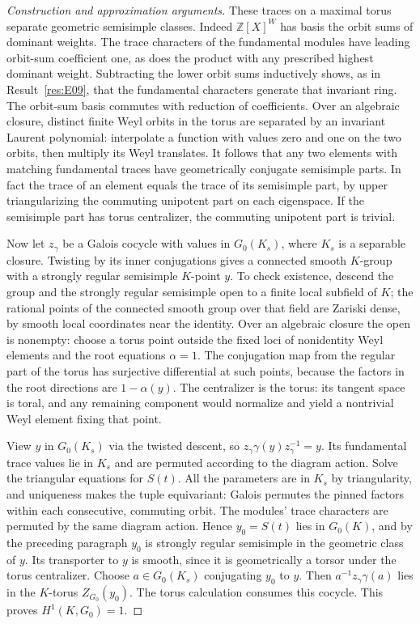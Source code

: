 \documentclass[11pt,a4paper,openany,oneside]{book}
\theoremstyle{resultstyle}
\theoremstyle{definition}
\numberwithin{equation}{chapter}
\begin{document}
\begin{proof}[Construction and approximation arguments]
These traces on a maximal torus separate geometric
semisimple classes. Indeed \(\mathbb Z[X]^W\) has basis
the orbit sums of dominant weights. The trace characters
of the fundamental modules have leading orbit-sum
coefficient one, as does the product with any prescribed
highest dominant weight. Subtracting the lower orbit
sums inductively shows, as in Result~\ref{res:E09},
that the fundamental characters generate that invariant
ring. The orbit-sum basis commutes with reduction of
coefficients. Over an algebraic closure, distinct finite
Weyl orbits in the torus are separated by an invariant
Laurent polynomial: interpolate a function with values
zero and one on the two orbits, then multiply its
Weyl translates. It follows that any two elements with
matching fundamental traces have geometrically conjugate
semisimple parts. In fact the trace of an element equals
the trace of its semisimple part, by upper triangularizing
the commuting unipotent part on each eigenspace. If the
semisimple part has torus centralizer, the commuting
unipotent part is trivial.

Now let \(z_\gamma\) be a Galois cocycle with values
in \(G_0(K_s)\), where \(K_s\) is a separable closure.
Twisting by its inner conjugations gives a connected
smooth \(K\)-group with a strongly regular semisimple
\(K\)-point \(y\). To check existence, descend the group
and the strongly regular semisimple open to a finite
local subfield of \(K\); the rational points of the
connected smooth group over that field are Zariski
dense, by smooth local coordinates near the identity.
Over an algebraic closure the open is nonempty:
choose a torus point outside the fixed loci of
nonidentity Weyl elements and the root equations
\(\alpha=1\). The conjugation map from the regular
part of the torus has surjective differential at
such points, because the factors in the root
directions are \(1-\alpha(y)\). The centralizer is
the torus: its tangent space is toral, and any
remaining component would normalize and yield a
nontrivial Weyl element fixing that point.

View \(y\) in \(G_0(K_s)\) via the twisted descent, so
\(z_\gamma\gamma(y)z_\gamma^{-1}=y\). Its fundamental
trace values lie in \(K_s\) and are permuted according
to the diagram action. Solve the triangular equations
for \(S(t)\). All the parameters are in \(K_s\) by
triangularity, and uniqueness makes the tuple
equivariant: Galois permutes the pinned factors within
each consecutive, commuting orbit. The modules' trace
characters are permuted by the same diagram action.
Hence \(y_0=S(t)\) lies in \(G_0(K)\), and by the
preceding paragraph \(y_0\) is strongly regular
semisimple in the geometric class of \(y\). Its
transporter to \(y\) is smooth, since it is geometrically
a torsor under the torus centralizer. Choose
\(a\in G_0(K_s)\) conjugating \(y_0\) to \(y\).
Then \(a^{-1}z_\gamma\gamma(a)\) lies in the
\(K\)-torus \(Z_{G_0}(y_0)\). The torus calculation
consumes this cocycle. This proves \(H^1(K,G_0)=1\).


\end{proof}
\end{document}

